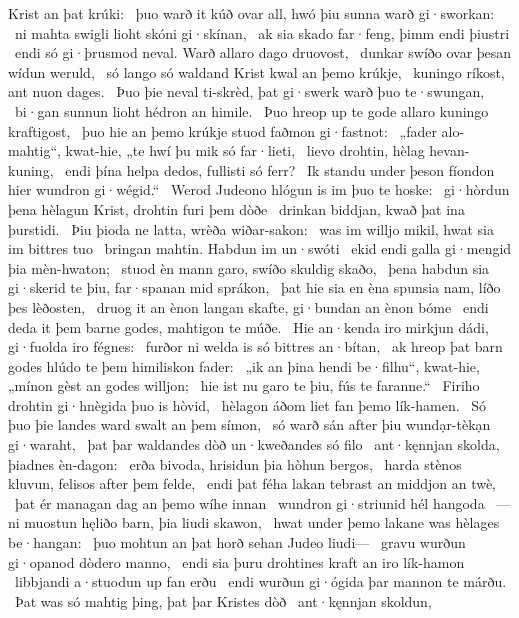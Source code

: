 Krist an þat krúki: \hld\ þuo warð it kúð ovar all,
hwó þiu sunna warð gi·sworkan: \hld\ ni mahta swigli lioht
skóni gi·skínan, \hld\ ak sia skado far·feng,
þimm endi þiustri \hld\ endi só gi·þrusmod neval.
Warð allaro dago druovost, \hld\ dunkar swíðo
ovar þesan wídun weruld, \hld\ só lango só waldand Krist
kwal an þemo krúkje, \hld\ kuningo ríkost,
ant nuon dages. \hld\ Þuo þie neval ti-skrèd,
þat gi·swerk warð þuo te·swungan, \hld\ bi·gan sunnun lioht
hédron an himile. \hld\ Þuo hreop up te gode
allaro kuningo kraftigost, \hld\ þuo hie an þemo krúkje stuod
faðmon gi·fastnot: \hld\ „fader alo-mahtig“, kwat-hie,
„te hwí þu mik só far·lieti, \hld\ lievo drohtin,
hèlag hevan-kuning, \hld\ endi þína helpa dedos,
fullisti só ferr? \hld\ Ik standu under þeson fíondon hier
wundron gi·wégid.“ \hld\ Werod Judeono
hlógun is im þuo te hoske: \hld\ gi·hòrdun þena hèlagun Krist,
drohtin furi þem dòðe \hld\ drinkan biddjan,
kwað þat ina þurstidi. \hld\ Þiu þioda ne latta,
wrèða wiðar-sakon: \hld\ was im willjo mikil,
hwat sia im bittres tuo \hld\ bringan mahtin.
Habdun im un·swóti \hld\ ekid endi galla
gi·mengid þia mèn-hwaton; \hld\ stuod èn mann garo,
swíðo skuldig skaðo, \hld\ þena habdun sia gi·skerid te þiu,
far·spanan mid sprákon, \hld\ þat hie sia en èna spunsia nam,
líðo þes lèðosten, \hld\ druog it an ènon langan skafte,
gi·bundan an ènon bóme \hld\ endi deda it þem barne godes,
mahtigon te múðe. \hld\ Hie an·kenda iro mirkjun dádi,
gi·fuolda iro fégnes: \hld\ furðor ni welda
is só bittres an·bítan, \hld\ ak hreop þat barn godes
hlúdo te þem himiliskon fader: \hld\ „ik an þina hendi be·filhu“, kwat-hie,
„mínon gèst an godes willjon; \hld\ hie ist nu garo te þiu,
fús te faranne.“ \hld\ Firiho drohtin
gi·hnègida þuo is hòvid, \hld\ hèlagon áðom
liet fan þemo lík-hamen. \hld\ Só þuo þie landes ward
swalt an þem símon, \hld\ só warð sán after þiu
wundạr-tèkạn gi·waraht, \hld\ þat þar waldandes dòð
un·kweðandes só filo \hld\ ant·kęnnjan skolda,
þiadnes èn-dagon: \hld\ erða bivoda,
hrisidun þia hòhun bergos, \hld\ harda stènos kluvun,
felisos after þem felde, \hld\ endi þat féha lakan tebrast
an middjon an twè, \hld\ þat ér managan dag
an þemo wíhe innan \hld\ wundron gi·striunid
hél hangoda \hld\ —ni muostun hęliðo barn,
þia liudi skawon, \hld\ hwat under þemo lakane was
hèlages be·hangan: \hld\ þuo mohtun an þat horð sehan
Judeo liudi— \hld\ gravu wurðun gi·opanod
dòdero manno, \hld\ endi sia þuru drohtines kraft
an iro lík-hamon \hld\ libbjandi a·stuodun
up fan erðu \hld\ endi wurðun gi·ógida þar
mannon te márðu. \hld\ Þat was só mahtig þing,
þat þar Kristes dòð \hld\ ant·kęnnjan skoldun,
